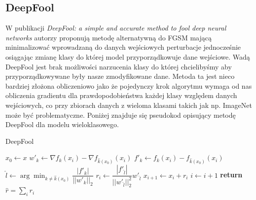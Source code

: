 \documentclass{article}
\begin{document}
\subsection{DeepFool}
W publikacji \textit{DeepFool: a simple and accurate method to fool deep neural networks}\cite{DBLP:journals/corr/Moosavi-Dezfooli15}
autorzy proponują metodę alternatywną do FGSM mającą minimalizować wprowadzaną do danych wejściowych perturbacje jednocześnie
osiągając zmianę klasy do której model przyporządkowuje dane wejściowe.
Wadą DeepFool jest brak możliwości narzucenia klasy do której chcielibyśmy aby przyporządkowywane były nasze zmodyfikowane dane.
Metoda ta jest nieco bardziej złożona obliczeniowo jako że pojedynczy krok algorytmu wymaga od nas obliczenia gradientu dla
prawdopodobieństwa każdej klasy względem danych wejściowych, co przy zbiorach danych z wieloma klasami
takich jak np. ImageNet może być problematyczne. Poniżej znajduje się pseudokod opisujący metodę DeepFool dla modelu
wieloklasowego.
\begin{algorithm}
\caption{DeepFool}\label{DeepFool}
\begin{algorithmic}[1]
\State $x_0 \gets x$
    \State $w'_k\gets \nabla f_k(x_i) - \nabla f_{\hat{k}(x_0)}(x_i)$
    \State $f'_k\gets f_{k}(x_i) - f_{\hat{k}(x_0)}(x_i)$
\EndFor
\State $\hat{l}\gets \arg \min_{k\neq\hat{k}(x_0)} \dfrac{|f'_k|}{||w'_k||_2}$
\State $r_i\gets \dfrac{|f'_{\hat{l}}|}{||w'_{\hat{l}}||^2_2}w'_{\hat{l}}$
\State $x_{i+1}\gets x_i + r_i$
\State $i\gets i + 1$
\EndWhile
\State \textbf{return} $\hat{r} = \sum_{i} r_i$
\end{algorithmic}
\end{algorithm}
\end{document}
